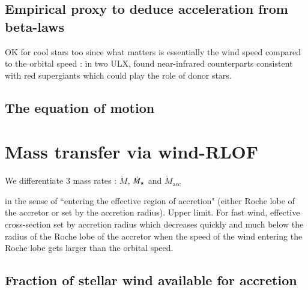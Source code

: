 \documentclass[letter]{aa}
\makeatletter
\newcommand{\ulx}{ULX\xspace}
\newcommand{\mystar}{{\fontfamily{lmr}\selectfont$\star$}}
\newcommand*{\mdotstar}{$\dot{M}_{\text{\mystar}}$\@\xspace}
\newcommand*{\mdotacc}{$\dot{M}_{\text{acc}}$\@\xspace}
\makeatother
\begin{document}
\subsection{Empirical proxy to deduce acceleration from beta-laws}
\label{sec:}

OK for cool stars too since what matters is essentially the wind speed compared to the orbital speed : in two \ulx, \cite{Heida2016} found near-infrared counterparts consistent with red supergiants which could play the role of donor stars.

\subsection{The equation of motion}
\label{sec:}

\section{Mass transfer via wind-RLOF}
\label{sec:}

We differentiate 3 mass rates : $\dot{M}$, \mdotstar and \mdotacc

in the sense of “entering the effective region of accretion" (either Roche lobe of the accretor or set by the accretion radius). Upper limit. For fast wind, effective cross-section set by accretion radius which decreases quickly and much below the radius of the Roche lobe of the accretor when the speed of the wind entering the Roche lobe gets larger than the orbital speed.

\subsection{Fraction of stellar wind available for accretion}
\label{sec:}
\end{document}
